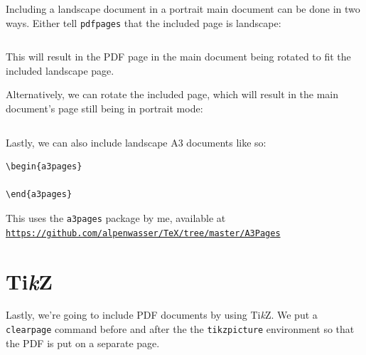 \documentclass[a4paper,oneside]{article}
\newcommand\code[1]{\texttt{#1}}
\begin{document}


Including a landscape document in a portrait  main document can be done in two
ways.  Either tell \code{pdfpages} that the included page is landscape:

\begin{verbatim}

\end{verbatim}

This will result in the PDF page in the main document being rotated to fit the
included landscape page.



Alternatively, we can rotate the included  page, which will result in the main
document's page still being in portrait mode:

\begin{verbatim}

\end{verbatim}



Lastly, we can also include landscape A3 documents like so:

\begin{verbatim}
\begin{a3pages}
    
\end{a3pages}
\end{verbatim}

This uses the \code{a3pages} package by me, available at 
\href{https://github.com/alpenwasser/TeX/tree/master/A3Pages}
     {\nolinkurl{https://github.com/alpenwasser/TeX/tree/master/A3Pages}}

\begin{a3pages}
    
\end{a3pages}


\clearpage
\section{Ti\emph{k}Z}
\label{sec:tikz}

Lastly,  we're going  to include  PDF documents  by using  Ti\emph{k}Z. We put
a  \code{clearpage}  command  before  and  after  the  the  \code{tikzpicture}
environment so that the PDF is put on a separate page.
\end{document}
